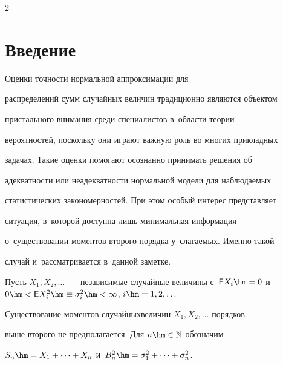 




\thispagestyle{headings}





\begin{multicols}{2}





\label{st\stat}





\section{Введение}





Оценки точности нормальной аппроксимации для


распределений сумм случайных величин традиционно являются объектом


пристального внимания среди специалистов в~области тео\-рии


вероятностей, поскольку они играют важную роль во многих прикладных


задачах. Такие оценки помогают осознанно принимать решения об


адекватности или неадекватности нормальной модели для наблюдаемых


статистических закономерностей. При этом особый интерес представляет


ситуация, в~которой доступна лишь минимальная информация 


о~существовании моментов второго порядка у~слагаемых. Именно такой


случай и~рассматривается в~данной заметке.





Пусть $X_1,X_2,\ldots$~--- независимые случайные величины с~${\sf E}


X_i\hm=0$ и~$0\hm<{\sf E} X_i^2\hm\equiv\sigma_i^2\hm<\infty$, $i\hm=1,2,\ldots $


Существование моментов случайных\linebreak величин $X_1,X_2,\ldots$ порядков


выше второго не предполагается. Для $n\hm\in\mathbb{N}$ обозначим


$S_n\hm=X_1+\cdots +X_n$ и~$B_n^2\hm=\sigma_1^2+\cdots +\sigma_n^2$.



\end{multicols}
